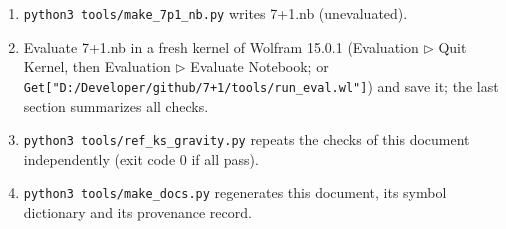 \documentclass[10pt,a4paper]{article}
\begin{document}
\begin{enumerate}
\item \texttt{python3 tools/\allowbreak{}make\_\allowbreak{}7p1\_\allowbreak{}nb.py} writes 7+1.nb (unevaluated).
\item Evaluate 7+1.nb in a fresh kernel of Wolfram 15.0.1 (Evaluation \texorpdfstring{\ensuremath{\triangleright}}{▸} Quit Kernel, then Evaluation \texorpdfstring{\ensuremath{\triangleright}}{▸} Evaluate Notebook; or \texttt{Get["D:/\allowbreak{}Developer/\allowbreak{}github/\allowbreak{}7+1/\allowbreak{}tools/\allowbreak{}run\_\allowbreak{}eval.wl"]}) and save it; the last section summarizes all checks.
\item \texttt{python3 tools/\allowbreak{}ref\_\allowbreak{}ks\_\allowbreak{}gravity.py} repeats the checks of this document independently (exit code 0 if all pass).
\item \texttt{python3 tools/\allowbreak{}make\_\allowbreak{}docs.py} regenerates this document, its symbol dictionary and its provenance record.
\end{enumerate}
\end{document}
